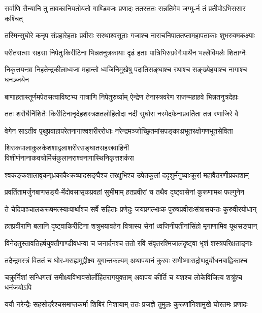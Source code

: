 \twolineshloka
{सर्वाणि सैन्यानि तु तावकानियतोयतो गाण्डिवजः प्रणादः}
{ततस्ततः सन्नतिमेव जग्मु-र्न तं प्रतीपोऽभिससार कश्चित्}


\twolineshloka
{तस्मिन्सुघोरे कनृप संप्रहारेहताः प्रवीराः सरथाश्वसूताः}
{गजाश्च नाराचनिपाततप्तामहापताकाः शुभरुक्मकक्ष्याः}


\twolineshloka
{परीतसत्वाः सहसा निपेतुःकिरीटिना भिन्नतनुत्रकायाः}
{दृढं हताः पात्रिभिरुग्रवेगैःपार्थेन भल्लैर्विमलैः शिताग्नैः}


\twolineshloka
{निकृत्तयन्त्रा निहतेन्द्रकीलाध्वजा महान्तो ध्वजिनिमुखेषु}
{पदातिसङ्घाश्च रथाश्च सङ्ख्येहयाश्च नागाश्च धनञ्जयेन}


\twolineshloka
{बाणाहतास्तूर्णमपेतसत्वाविष्टभ्य गात्राणि निपेतुरुर्व्याम्}
{ऐन्द्रेण तेनास्त्रवरेण राजन्महाहवे भिन्नतनुत्रदेहाः}


\twolineshloka
{ततः शरौघैर्निशितैः किरीटिनानृदेहशस्त्रक्षतलोहितोदा}
{नदी सुघोरा नरमेदफेनाप्रवर्तिता तत्र रणाजिरे वै}


\twolineshloka
{वेगेन साऽतीव पृथुप्रवाहापरेतनागाश्वशरीररोधाः}
{नरेन्द्रमञ्जोच्छ्रितमांसपङ्काःप्रभूतरक्षोगणभूतसेविता}


\twolineshloka
{शिरःकपालाकुलकेशशाद्वलाशरीरसङ्घातसहस्रवाहिनी}
{विशीर्णनानाकवचोर्मिसंकुलानराश्वनागास्थिनिकृत्तशर्करा}


\twolineshloka
{श्वकङ्कशालावृकगृध्रकाकैःक्रव्यादसङ्घैश्च तरक्षुभिश्च}
{उपेतकूलां ददृशुर्मनुष्याःक्रूरां महावैतरणीप्रकाशाम्}


\twolineshloka
{प्रवर्तितामर्जुनबाणसङ्घै-र्मेदोवसासृकप्रवहां सुभीमाम्}
{हतप्रवीरां च तथैव दृष्ट्वासेनां कुरूणामथ फल्गुनेन}


\twolineshloka
{ते चेदिपाञ्चालकरूषमत्स्याःपार्थाश्च सर्वे सहिताः प्रणेदुः}
{जयप्रगल्भाःक पुरुषप्रवीराःसंत्रासयन्तः कुरुवीरयोधान्}


\twolineshloka
{हतप्रवीराणि बलानि दृष्ट्वाकिरीटिना शत्रुभयावहेन}
{वित्रास्य सेनां ध्वजिनीपतीनांसिंहो मृगाणामिव यूथसङ्घान्}


\twolineshloka
{विनेदतुस्तावतिहर्षयुक्तौगाण्डीवधन्वा च जनार्दनश्च}
{ततो रविं संवृतरश्मिजालंदृष्ट्वा भृशं शस्त्रपरिक्षताङ्गाः}


\twolineshloka
{तदैन्द्रमस्त्रं विततं च घोर-मसह्यमुद्वीक्ष्य युगान्तकल्पम्}
{अथापयानं कुरवः सभीष्माःसद्रोणदुर्योधनबाह्लिकाश्च}


\twolineshloka
{चक्रुर्निशां सन्धिगतां समीक्ष्यविभावसोर्लोहितरागयुक्ताम्}
{अवापय कीर्ति च यशश्च लोकेविजित्य शत्रूंश्च धनंजयोऽपि}


\twolineshloka
{ययौ नरेन्द्रैः सहसोदरैश्चसमाप्तकर्मा शिबिरं निशायाम्}
{ततः प्रजज्ञे तुमुलः कुरूणांनिशामुखे घोरतमः प्रणादः}


